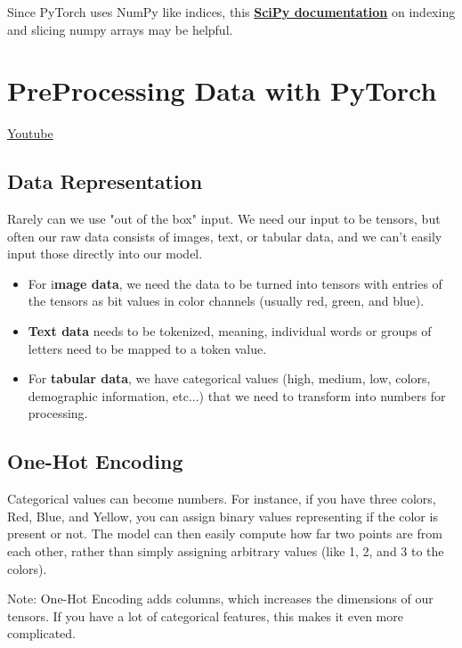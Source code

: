 Since PyTorch uses NumPy like indices, this \href{https://docs.scipy.org/doc/numpy-1.10.1/reference/arrays.indexing.html}{\textbf{SciPy documentation}} on indexing and slicing numpy arrays may be helpful.

\section{PreProcessing Data with PyTorch}
\href{https://www.youtube.com/watch?v=q8GER-HSg14&t=3s&ab_channel=Udacity}{Youtube} \newline

\subsection{Data Representation}

Rarely can we use "out of the box" input. We need our input to be tensors, but often our raw data consists of images, text, or tabular data, and we can't easily input those directly into our model.

\begin{itemize}
    \item For i\textbf{mage data}, we need the data to be turned into tensors with entries of the tensors as bit values in color channels (usually red, green, and blue).
    \item \textbf{Text data} needs to be tokenized, meaning, individual words or groups of letters need to be mapped to a token value.
    \item For \textbf{tabular data}, we have categorical values (high, medium, low, colors, demographic information, etc...) that we need to transform into numbers for processing.
\end{itemize}

\subsection{One-Hot Encoding}

Categorical values can become numbers. For instance, if you have three colors, Red, Blue, and Yellow, you can assign binary values representing if the color is present or not. The model can then easily compute how far two points are from each other, rather than simply assigning arbitrary values (like 1, 2, and 3 to the colors).

Note: One-Hot Encoding adds columns, which increases the dimensions of our tensors. If you have a lot of categorical features, this makes it even more complicated.

